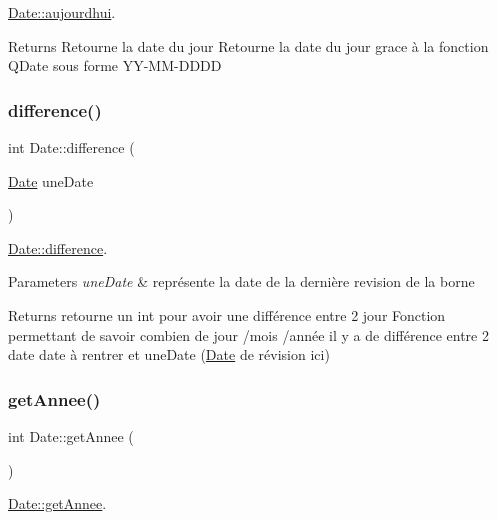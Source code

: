 \hyperlink{class_date_a4712c0d9ecfeb49472a847a905f62150}{Date\+::aujourdhui}. 

\begin{DoxyReturn}{Returns}
Retourne la date du jour Retourne la date du jour grace à la fonction Q\+Date sous forme Y\+Y-\/\+M\+M-\/\+D\+D\+DD 
\end{DoxyReturn}
\mbox{\label{class_date_a45f1086b5028cdc71f7645f0a91d7731}} 
\subsubsection{\texorpdfstring{difference()}{difference()}}
{\footnotesize\ttfamily int Date\+::difference (\begin{DoxyParamCaption}\item[{\hyperlink{class_date}{Date}}]{une\+Date }\end{DoxyParamCaption})}



\hyperlink{class_date_a45f1086b5028cdc71f7645f0a91d7731}{Date\+::difference}. 


\begin{DoxyParams}{Parameters}
{\em une\+Date} & représente la date de la dernière revision de la borne \\
\hline
\end{DoxyParams}
\begin{DoxyReturn}{Returns}
retourne un int pour avoir une différence entre 2 jour Fonction permettant de savoir combien de jour /mois /année il y a de différence entre 2 date date à rentrer et une\+Date (\hyperlink{class_date}{Date} de révision ici) 
\end{DoxyReturn}
\mbox{\label{class_date_a99c5677274bdaffadaedad4c888ccbca}} 
\subsubsection{\texorpdfstring{get\+Annee()}{getAnnee()}}
{\footnotesize\ttfamily int Date\+::get\+Annee (\begin{DoxyParamCaption}{ }\end{DoxyParamCaption})}



\hyperlink{class_date_a99c5677274bdaffadaedad4c888ccbca}{Date\+::get\+Annee}. 

